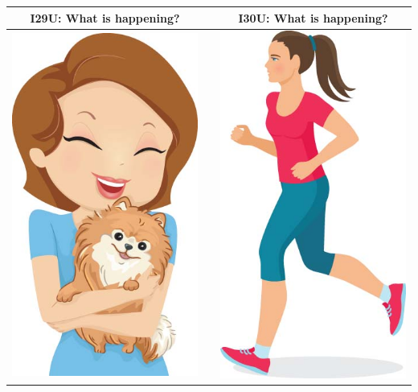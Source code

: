 \documentclass[12pt,notitlepage]{article}
\begin{document}
\begin{center}
\begin{tabular}{|c|c|c|}
\hline
I29U: What is happening? && I30U: What is happening? \\
\hline
\includegraphics[width=20em,trim=0 0 0 -3]{figures/I29.jpg} & & \includegraphics[width=20em,trim=0 0 0 -3]{figures/I30.jpg} \\
\hline
\end{tabular}
\end{center}
\end{document}
